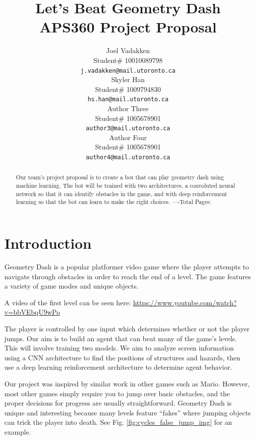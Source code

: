 \documentclass{article} %
\title{Let's Beat Geometry Dash  \\ 
APS360 Project Proposal}
\author{Joel Vadakken  \\
Student\# 10010089798\\
\texttt{j.vadakken@mail.utoronto.ca} \\
\And
Skyler Han  \\
Student\# 1009794830 \\
\texttt{hs.han@mail.utoronto.ca} \\
\AND
Author Three  \\
Student\# 1005678901 \\
\texttt{author3@mail.utoronto.ca} \\
\And
Author Four \\
Student\# 1005678901 \\
\texttt{author4@mail.utoronto.ca} \\
\AND
}
\begin{document}
\maketitle

\begin{abstract}
Our team's project proposal is to create a bot that can play 
geometry dash using machine learning. The bot will be trained
with two architectures, a convoluted neural network so that it
can identify obstacles in the game, and with deep reinforcement
learning so that the bot can learn to make the right choices.
----Total Pages: \pageref{last_page}
\end{abstract}



\section{Introduction}

Geometry Dash is a popular platformer video game 
where the player attempts to navigate through 
obstacles in order to reach the end of a level. 
The game features a variety of game modes and 
unique objects.

A video of the first level can be seen here:
\href{https://www.youtube.com/watch?v=bbVEbqU9wPo}{https://www.youtube.com/watch?v=bbVEbqU9wPo} 

The player is controlled by one input which 
determines whether or not the player jumps. 
Our aim is to build an agent that can beat many 
of the game’s levels. This will involve training 
two models. We aim to analyze screen information 
using a CNN architecture to find the positions 
of structures and hazards, then use a deep 
learning reinforcement architecture to determine 
agent behavior.

Our project was inspired by similar work in other
games such as Mario. However, most other games 
simply require you to jump over basic obstacles,
and the proper decisions for progress are usually 
straightforward. Geometry Dash is unique and 
interesting because many levels feature “fakes” 
where jumping objects can trick the player into death.
See Fig. \ref{fig:cycles_false_jump_img} for an example. 
\end{document}
